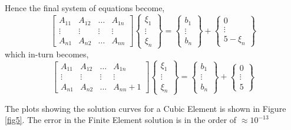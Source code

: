 \begin{example}
	Hence the final system of equations become,
	\begin{equation}
		\begin{bmatrix}
		A_{11} & A_{12} & \dots & A_{1n}\\
		\vdots & \vdots & \vdots & \vdots\\
		A_{n1} & A_{n2} & \dots & A_{nn}
		\end{bmatrix} 
		\begin{Bmatrix}
		\xi_1\\
		\vdots\\
		\xi_n
		\end{Bmatrix} = 
		\begin{Bmatrix}
		b_1\\
		\vdots\\
		b_n
		\end{Bmatrix} +
		\begin{Bmatrix}
		0\\
		\vdots\\
		5 - \xi_n
		\end{Bmatrix}
	\end{equation}
	which in-turn becomes,
	\begin{equation}
		\begin{bmatrix}
		A_{11} & A_{12} & \dots & A_{1n}\\
		\vdots & \vdots & \vdots & \vdots\\
		A_{n1} & A_{n2} & \dots & A_{nn}+1
		\end{bmatrix} 
		\begin{Bmatrix}
		\xi_1\\
		\vdots\\
		\xi_n
		\end{Bmatrix} = 
		\begin{Bmatrix}
		b_1\\
		\vdots\\
		b_n
		\end{Bmatrix} +
		\begin{Bmatrix}
		0\\
		\vdots\\
		5
		\end{Bmatrix}
	\end{equation}
	
	The plots showing the solution curves for a Cubic Element is shown in Figure \ref{fig5}. The error in the Finite Element solution is in the order of $\approx 10^{-13}$
	

\end{example}
